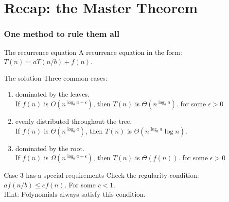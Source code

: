 \section{Recap: the Master Theorem}
\label{sec:recap_the_master_theorem}

\begin{frame}
	\frametitle{One method to rule them all}

	\begin{overlayarea}{\textwidth}{1.2\textheight}
		\begin{problemblock}{The recurrence equation}
			\scriptsize
			A recurrence equation in the form: $T(n) = a T(n/b) + f(n)$.
		\end{problemblock}
		
		\begin{answerblock}{The solution}
				\scriptsize
			Three common cases:
			\begin{enumerate}
				\item	dominated by \alert{the leaves}. \hfill\\
					If $f(n)$ is $O(n^{\log_b a - \epsilon})$, then $T(n)$ is $\Theta(n^{\log_b a})$. {\small\hfill for some $\epsilon > 0$}
				\item<2->	\alert{evenly distributed} throughout the tree.\hfill\\
					If $f(n)$ is $\Theta(n^{\log_b a})$, then $T(n)$ is $\Theta(n^{\log_b a} \log n)$. 
				\item<3->	dominated by \alert{the root}.\hfill\\
					If $f(n)$ is $\Omega(n^{\log_b a + \epsilon})$, then $T(n)$ is $ \Theta(f(n))$. {\small\hfill for some $\epsilon > 0$}
			\end{enumerate}	
		\end{answerblock}
			\begin{block}{Case 3 has a special requirements}
				\small
				Check the regularity condition: $a f(n/b) \leq c f(n)$. For some $c < 1$.\\
				Hint: Polynomials always satisfy this condition.
			\end{block}	
	\end{overlayarea}
\end{frame}
